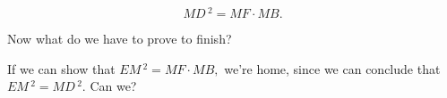 





$$MD\,^2 = MF\cdot MB.$$

Now what do we have to prove to finish?















If we can show that $EM\,^2 = MF\cdot MB,$ we're home, since we can conclude that $EM\,^2 = MD\,^2.$ Can we?

